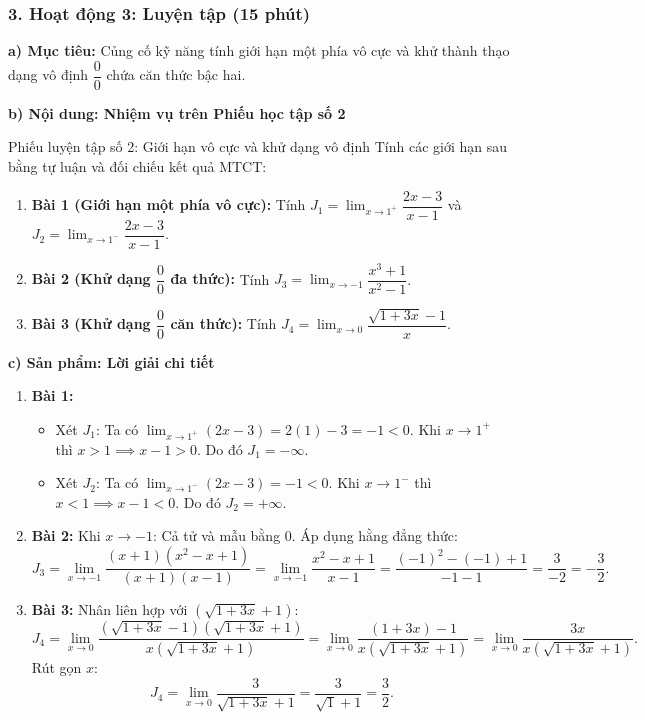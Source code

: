 \documentclass[12pt, a4paper]{article}
\begin{document}
\subsubsection*{3. Hoạt động 3: Luyện tập (15 phút)}

\noindent \textbf{a) Mục tiêu:}
Củng cố kỹ năng tính giới hạn một phía vô cực và khử thành thạo dạng vô định $\dfrac{0}{0}$ chứa căn thức bậc hai.

\noindent \textbf{b) Nội dung: Nhiệm vụ trên Phiếu học tập số 2}
\begin{pedabox}{Phiếu luyện tập số 2: Giới hạn vô cực và khử dạng vô định}
Tính các giới hạn sau bằng tự luận và đối chiếu kết quả MTCT:
\begin{enumerate}[leftmargin=0.6cm]
    \item \textbf{Bài 1 (Giới hạn một phía vô cực):} Tính $J_1 = \lim_{x \to 1^+} \dfrac{2x - 3}{x - 1}$ và $J_2 = \lim_{x \to 1^-} \dfrac{2x - 3}{x - 1}$.
    \item \textbf{Bài 2 (Khử dạng $\dfrac{0}{0}$ đa thức):} Tính $J_3 = \lim_{x \to -1} \dfrac{x^3 + 1}{x^2 - 1}$.
    \item \textbf{Bài 3 (Khử dạng $\dfrac{0}{0}$ căn thức):} Tính $J_4 = \lim_{x \to 0} \dfrac{\sqrt{1 + 3x} - 1}{x}$.
\end{enumerate}
\end{pedabox}

\noindent \textbf{c) Sản phẩm: Lời giải chi tiết}
\begin{enumerate}[leftmargin=0.6cm]
    \item \textbf{Bài 1:}
    \begin{itemize}
        \item Xét $J_1$: Ta có $\lim_{x \to 1^+} (2x - 3) = 2(1) - 3 = -1 < 0$. Khi $x \to 1^+$ thì $x > 1 \implies x - 1 > 0$. Do đó $J_1 = -\infty$.
        \item Xét $J_2$: Ta có $\lim_{x \to 1^-} (2x - 3) = -1 < 0$. Khi $x \to 1^-$ thì $x < 1 \implies x - 1 < 0$. Do đó $J_2 = +\infty$.
    \end{itemize}
    \item \textbf{Bài 2:} Khi $x \to -1$: Cả tử và mẫu bằng 0. Áp dụng hằng đẳng thức:
    $$J_3 = \lim_{x \to -1} \dfrac{(x + 1)(x^2 - x + 1)}{(x + 1)(x - 1)} = \lim_{x \to -1} \dfrac{x^2 - x + 1}{x - 1} = \dfrac{(-1)^2 - (-1) + 1}{-1 - 1} = \dfrac{3}{-2} = -\dfrac{3}{2}.$$
    \item \textbf{Bài 3:} Nhân liên hợp với $(\sqrt{1 + 3x} + 1)$:
    $$J_4 = \lim_{x \to 0} \dfrac{(\sqrt{1 + 3x} - 1)(\sqrt{1 + 3x} + 1)}{x(\sqrt{1 + 3x} + 1)} = \lim_{x \to 0} \dfrac{(1 + 3x) - 1}{x(\sqrt{1 + 3x} + 1)} = \lim_{x \to 0} \dfrac{3x}{x(\sqrt{1 + 3x} + 1)}.$$
    Rút gọn $x$:
    $$J_4 = \lim_{x \to 0} \dfrac{3}{\sqrt{1 + 3x} + 1} = \dfrac{3}{\sqrt{1} + 1} = \dfrac{3}{2}.$$
\end{enumerate}
\end{document}
